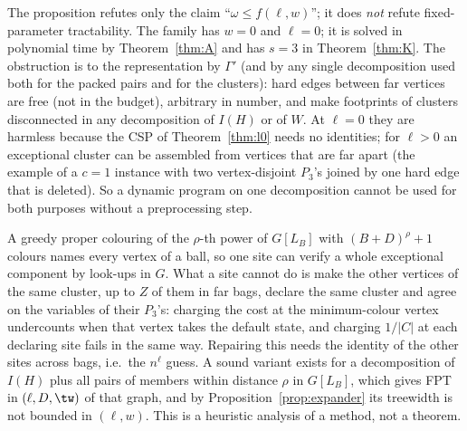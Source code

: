 \begin{remark}\label{rem:expscope}
The proposition refutes only the claim ``$\omega\le f(\ell,w)$''; it does \emph{not} refute fixed-parameter tractability. The family has $w=0$ and $\ell=0$; it is solved in polynomial time by Theorem~\ref{thm:A} and has $s=3$ in Theorem~\ref{thm:K}. The obstruction is to the representation by $\Gamma'$ (and by any single decomposition used both for the packed pairs and for the clusters): hard edges between far vertices are free (not in the budget), arbitrary in number, and make footprints of clusters disconnected in any decomposition of $I(H)$ or of $W$. At $\ell=0$ they are harmless because the CSP of Theorem~\ref{thm:l0} needs no identities; for $\ell>0$ an exceptional cluster can be assembled from vertices that are far apart (the example of a $c=1$ instance with two vertex-disjoint $P_3$'s joined by one hard edge that is deleted). So a dynamic program on one decomposition cannot be used for both purposes without a preprocessing step.
\end{remark}

\begin{remark}\label{rem:colour}
A greedy proper colouring of the $\rho$-th power of $G[L_B]$ with $(B+D)^{\rho}+1$ colours names every vertex of a ball, so one site can verify a whole exceptional component by look-ups in $G$. What a site cannot do is make the other vertices of the same cluster, up to $Z$ of them in far bags, declare the same cluster and agree on the variables of their $P_3$'s: charging the cost at the minimum-colour vertex undercounts when that vertex takes the default state, and charging $1/|C|$ at each declaring site fails in the same way. Repairing this needs the identity of the other sites across bags, i.e.\ the $n^{\ell}$ guess. A sound variant exists for a decomposition of $I(H)$ plus all pairs of members within distance $\rho$ in $G[L_B]$, which gives FPT in $(\ell,D,\tw)$ of that graph, and by Proposition~\ref{prop:expander} its treewidth is not bounded in $(\ell,w)$. This is a heuristic analysis of a method, not a theorem.
\end{remark}

